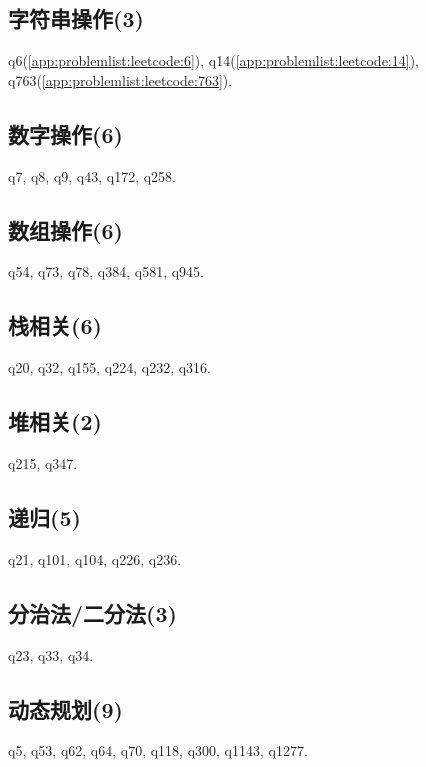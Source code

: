 \subsection{字符串操作(3)}
q6(\ref{app:problemlist:leetcode:6}),
q14(\ref{app:problemlist:leetcode:14}),
q763(\ref{app:problemlist:leetcode:763}).

\subsection{数字操作(6)}
q7,
q8,
q9,
q43,
q172,
q258.

\subsection{数组操作(6)}
q54,
q73,
q78,
q384,
q581,
q945.

\subsection{栈相关(6)}
q20,
q32,
q155,
q224,
q232,
q316.

\subsection{堆相关(2)}
q215,
q347.

\subsection{递归(5)}
q21,
q101,
q104,
q226,
q236.

\subsection{分治法/二分法(3)}
q23,
q33,
q34.

\subsection{动态规划(9)}
q5,
q53,
q62,
q64,
q70,
q118,
q300,
q1143,
q1277.

